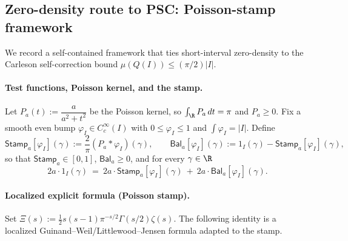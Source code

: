 \documentclass[11pt]{article}
\theoremstyle{remark}
\begin{document}
\subsection{Zero-density route to PSC: Poisson-stamp framework}
We record a self-contained framework that ties short-interval zero-density to the Carleson self-correction bound \(\mu(Q(I))\le (\pi/2)|I|\).

\paragraph{Test functions, Poisson kernel, and the stamp.}
Let \(P_a(t):= \dfrac{a}{a^2+t^2}\) be the Poisson kernel, so \(\int_{\R} P_a\,dt=\pi\) and \(P_a\ge 0\). Fix a smooth even bump \(\varphi_I\in C_c^\infty(I)\) with \(0\le \varphi_I\le 1\) and \(\int \varphi_I=|I|\). Define
\[
 \mathsf{Stamp}_a[\varphi_I](\gamma):=\frac{2}{\pi}(P_a*\varphi_I)(\gamma),\qquad
 \mathsf{Bal}_a[\varphi_I](\gamma):=1_I(\gamma)-\mathsf{Stamp}_a[\varphi_I](\gamma),
\]
so that \(\mathsf{Stamp}_a\in[0,1]\), \(\mathsf{Bal}_a\ge 0\), and for every \(\gamma\in\R\)
\begin{equation}\label{eq:local-stamp-decomp}
 2a\cdot 1_I(\gamma)\ =\ 2a\cdot \mathsf{Stamp}_a[\varphi_I](\gamma)\ +\ 2a\cdot \mathsf{Bal}_a[\varphi_I](\gamma).
\end{equation}

\paragraph{Localized explicit formula (Poisson stamp).}
Set \(\Xi(s):=\tfrac12 s(s-1)\pi^{-s/2}\Gamma(s/2)\zeta(s)\). The following identity is a localized Guinand–Weil/Littlewood–Jensen formula adapted to the stamp.
\end{document}
